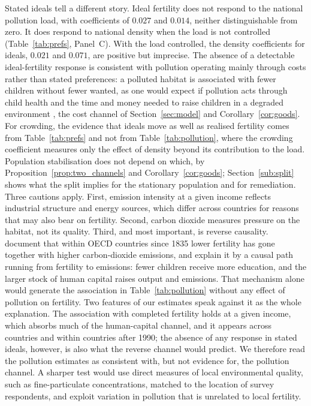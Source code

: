 \documentclass[11pt]{article}
\begin{document}
Stated ideals tell a different story. Ideal fertility does not respond to the national pollution load,
with coefficients of $0.027$ and $0.014$, neither distinguishable from zero. It does respond to national
density when the load is not controlled (Table~\ref{tab:prefs}, Panel~C). With the load controlled, the
density coefficients for ideals, $0.021$ and $0.071$, are positive but imprecise. The absence of a detectable ideal-fertility response is
consistent with pollution operating mainly through costs rather than stated preferences: a polluted
habitat is associated with fewer children without fewer wanted, as one would expect if pollution acts through child health and the time and money needed to
raise children in a degraded environment \citep{mari10,Varvarigos2013}, the cost channel of
Section~\ref{sec:model} and Corollary~\ref{cor:goods}. For crowding, the evidence that ideals move as well as realised fertility comes from
Table~\ref{tab:prefs} and not from Table~\ref{tab:pollution}, where the crowding coefficient measures
only the effect of density beyond its contribution to the load. Population stabilisation does not depend on
which, by Proposition~\ref{prop:two_channels} and Corollary~\ref{cor:goods}; Section~\ref{sub:split} shows
what the split implies for the stationary population and for remediation. Three cautions apply. First, emission intensity at a given
income reflects industrial structure and energy sources, which differ across countries for reasons that
may also bear on fertility. Second, carbon dioxide measures pressure on the habitat, not its quality.
Third, and most important, is reverse causality. \citet{beulmann2025} document that within OECD countries since 1835 lower fertility has gone
together with higher carbon-dioxide emissions, and explain it by a causal path running from fertility to
emissions: fewer children receive more education, and the larger stock of human capital raises output and
emissions. That mechanism alone would generate the association in Table~\ref{tab:pollution} without any
effect of pollution on fertility. Two features of our estimates speak against it as the whole explanation.
The association with completed fertility holds at a given income, which absorbs much of the human-capital
channel, and it appears across countries and within countries after 1990; the absence of any response in
stated ideals, however, is also what the reverse channel would predict. We therefore read the pollution
estimates as consistent with, but not evidence for, the pollution channel. A sharper test would use
direct measures of local environmental quality, such as fine-particulate concentrations, matched to the
location of survey respondents, and exploit variation in pollution that is unrelated to local fertility.
\end{document}
